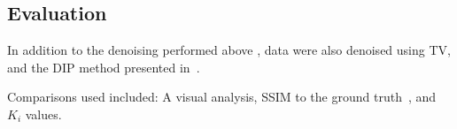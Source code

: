     
    \subsection{Evaluation} \label{sec:evaluation}
        In addition to the denoising performed above%
        , data were also denoised using \gls{TV}, and the \gls{DIP} method presented in~\cite{Gong2019PETPrior}.
        
        Comparisons used included: A visual analysis, \gls{SSIM} to the ground truth~\cite{Wang2009MeanMeasures}, and $K_i$ values.%


